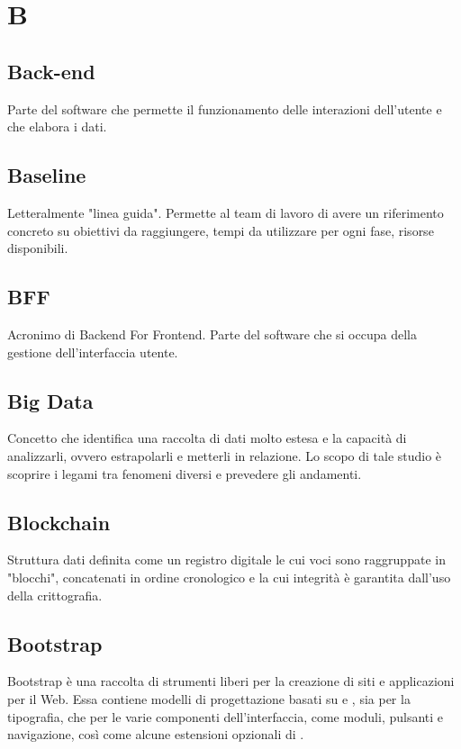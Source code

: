 \section*{B}
\markright{}

\subsection*{Back-end}
Parte del software che permette il funzionamento delle interazioni dell'utente e che elabora i dati.

\subsection*{Baseline}
Letteralmente "linea guida". Permette al team di lavoro di avere un riferimento concreto su obiettivi da raggiungere, tempi da utilizzare per ogni fase, risorse disponibili. 

\subsection*{BFF}
Acronimo di Backend For Frontend. Parte del software che si occupa della gestione dell'interfaccia utente.

\subsection*{Big Data}
Concetto che identifica una raccolta di dati molto estesa e la capacità di analizzarli, ovvero estrapolarli e metterli in relazione. Lo scopo di tale studio è scoprire i legami tra fenomeni diversi e prevedere gli andamenti.

\subsection*{Blockchain}
Struttura dati definita come un registro digitale le cui voci sono raggruppate in "blocchi", concatenati in ordine cronologico e la cui integrità è garantita dall'uso della crittografia.

\subsection*{Bootstrap}
Bootstrap è una raccolta di strumenti liberi per la creazione di siti e applicazioni per il Web. Essa contiene modelli di progettazione basati su  e , sia per la tipografia, che per le varie componenti dell'interfaccia, come moduli, pulsanti e navigazione, così come alcune estensioni opzionali di .

